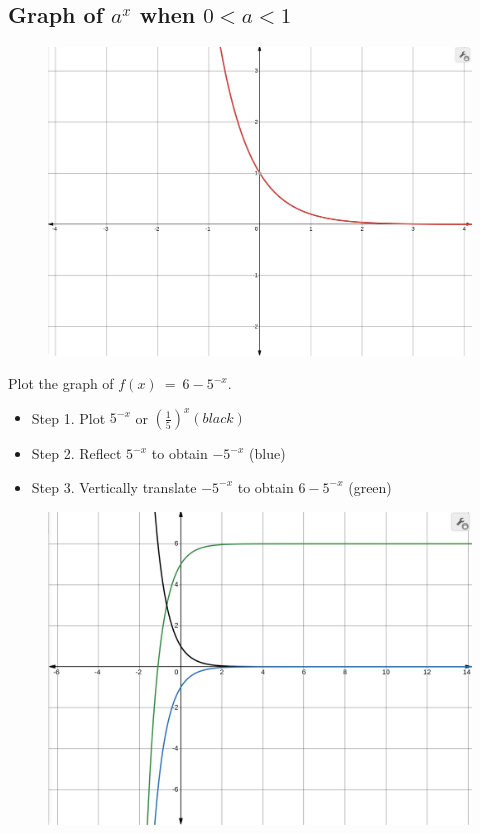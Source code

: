 \subsection*{Graph of \(a^{x}\) when \(0<a<1\)}

\begin{figure}[H]
  \centering
  \includegraphics[scale=0.15]{"./fig/exp_2.png"}
\end{figure}

\begin{example}
  Plot the graph of \( f\left(x\right)\ =\ 6-5^{-x}\).
\begin{itemize}
\item Step 1. Plot \( 5^{-x} \) or $ \left( \frac{1}{5} \right)^{x} (black)$
\item Step 2.  Reflect  \( 5^{-x} \) to obtain \( -5^{-x} \) (blue)
\item Step 3.  Vertically translate  \( -5^{-x} \) to obtain \( 6-5^{-x} \) (green)
\end{itemize}

\begin{figure}[H]
  \centering
  \includegraphics[scale=0.15]{"./fig/exp_tr.png"}
\end{figure}
\end{example}


